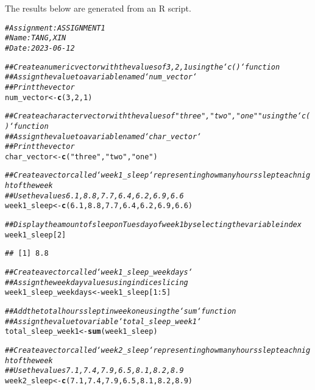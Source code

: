 \documentclass{article}\usepackage[]{graphicx}\usepackage[]{xcolor}
\makeatletter
\newcommand{\hlnum}[1]{\textcolor[rgb]{0.686,0.059,0.569}{#1}}%
\newcommand{\hlstr}[1]{\textcolor[rgb]{0.192,0.494,0.8}{#1}}%
\newcommand{\hlcom}[1]{\textcolor[rgb]{0.678,0.584,0.686}{\textit{#1}}}%
\newcommand{\hlopt}[1]{\textcolor[rgb]{0,0,0}{#1}}%
\newcommand{\hlstd}[1]{\textcolor[rgb]{0.345,0.345,0.345}{#1}}%
\newcommand{\hlkwb}[1]{\textcolor[rgb]{0.69,0.353,0.396}{#1}}%
\newcommand{\hlkwd}[1]{\textcolor[rgb]{0.737,0.353,0.396}{\textbf{#1}}}%
\newenvironment{kframe}{%
 \def\at@end@of@kframe{}%
 \ifinner\ifhmode%
  \def\at@end@of@kframe{\end{minipage}}%
  \begin{minipage}{\columnwidth}%
 \fi\fi%
 \def\FrameCommand##1{\hskip\@totalleftmargin \hskip-\fboxsep
 \colorbox{shadecolor}{##1}\hskip-\fboxsep
     \hskip-\linewidth \hskip-\@totalleftmargin \hskip\columnwidth}%
 \MakeFramed {\advance\hsize-\width
   \@totalleftmargin\z@ \linewidth\hsize
   \@setminipage}}%
 {\par\unskip\endMakeFramed%
 \at@end@of@kframe}
\newenvironment{knitrout}{}{} %
\makeatother
\begin{document}
The results below are generated from an R script.

\begin{knitrout}
\color{fgcolor}\begin{kframe}
\begin{alltt}
\hlcom{# Assignment: ASSIGNMENT 1}
\hlcom{# Name: TANG, XIN}
\hlcom{# Date: 2023-06-12}

\hlcom{## Create a numeric vector with the values of 3, 2, 1 using the `c()` function}
\hlcom{## Assign the value to a variable named `num_vector`}
\hlcom{## Print the vector}
\hlstd{num_vector} \hlkwb{<-} \hlkwd{c}\hlstd{(}\hlnum{3}\hlstd{,} \hlnum{2}\hlstd{,} \hlnum{1}\hlstd{)}

\hlcom{## Create a character vector with the values of "three", "two", "one" "using the `c()` function}
\hlcom{## Assign the value to a variable named `char_vector`}
\hlcom{## Print the vector}
\hlstd{char_vector} \hlkwb{<-} \hlkwd{c}\hlstd{(}\hlstr{"three"}\hlstd{,} \hlstr{"two"}\hlstd{,} \hlstr{"one"}\hlstd{)}

\hlcom{## Create a vector called `week1_sleep` representing how many hours slept each night of the week}
\hlcom{## Use the values 6.1, 8.8, 7.7, 6.4, 6.2, 6.9, 6.6}
\hlstd{week1_sleep} \hlkwb{<-} \hlkwd{c}\hlstd{(}\hlnum{6.1}\hlstd{,} \hlnum{8.8}\hlstd{,} \hlnum{7.7}\hlstd{,} \hlnum{6.4}\hlstd{,} \hlnum{6.2}\hlstd{,} \hlnum{6.9}\hlstd{,} \hlnum{6.6}\hlstd{)}

\hlcom{## Display the amount of sleep on Tuesday of week 1 by selecting the variable index}
\hlstd{week1_sleep[}\hlnum{2}\hlstd{]}
\end{alltt}
\begin{verbatim}
## [1] 8.8
\end{verbatim}
\begin{alltt}
\hlcom{## Create a vector called `week1_sleep_weekdays`}
\hlcom{## Assign the weekday values using indice slicing}
\hlstd{week1_sleep_weekdays} \hlkwb{<-} \hlstd{week1_sleep[}\hlnum{1}\hlopt{:}\hlnum{5}\hlstd{]}

\hlcom{## Add the total hours slept in week one using the `sum` function}
\hlcom{## Assign the value to variable `total_sleep_week1`}
\hlstd{total_sleep_week1} \hlkwb{<-} \hlkwd{sum}\hlstd{(week1_sleep)}

\hlcom{## Create a vector called `week2_sleep` representing how many hours slept each night of the week}
\hlcom{## Use the values 7.1, 7.4, 7.9, 6.5, 8.1, 8.2, 8.9}
\hlstd{week2_sleep} \hlkwb{<-} \hlkwd{c}\hlstd{(}\hlnum{7.1}\hlstd{,} \hlnum{7.4}\hlstd{,} \hlnum{7.9}\hlstd{,} \hlnum{6.5}\hlstd{,} \hlnum{8.1}\hlstd{,} \hlnum{8.2}\hlstd{,} \hlnum{8.9}\hlstd{)}


\end{alltt}
\end{kframe}
\end{knitrout}
\end{document}
